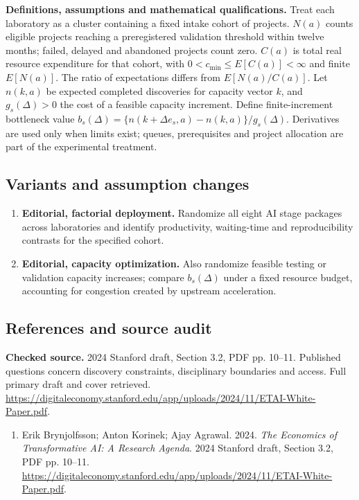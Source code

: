\documentclass[11pt,a4paper]{article}
\begin{document}
\textbf{Definitions, assumptions and mathematical qualifications.} Treat each laboratory as a cluster containing a fixed intake cohort of projects. \(N(a)\) counts eligible projects reaching a preregistered validation threshold within twelve months; failed, delayed and abandoned projects count zero. \(C(a)\) is total real resource expenditure for that cohort, with \(0<c_{\min}\leq E[C(a)]<\infty\) and finite \(E[N(a)]\). The ratio of expectations differs from \(E[N(a)/C(a)]\). Let \(n(k,a)\) be expected completed discoveries for capacity vector \(k\), and \(g_s(\Delta)>0\) the cost of a feasible capacity increment. Define finite-increment bottleneck value \(b_s(\Delta)=\{n(k+\Delta e_s,a)-n(k,a)\}/g_s(\Delta)\). Derivatives are used only when limits exist; queues, prerequisites and project allocation are part of the experimental treatment.
\subsection*{Variants and assumption changes}
\begin{enumerate}
\item \textbf{Editorial, factorial deployment.} Randomize all eight AI stage packages across laboratories and identify productivity, waiting-time and reproducibility contrasts for the specified cohort.
\item \textbf{Editorial, capacity optimization.} Also randomize feasible testing or validation capacity increases; compare \(b_s(\Delta)\) under a fixed resource budget, accounting for congestion created by upstream acceleration.
\end{enumerate}
\subsection*{References and source audit}
\textbf{Checked source.} 2024 Stanford draft, Section 3.2, PDF pp. 10--11. Published questions concern discovery constraints, disciplinary boundaries and access. Full primary draft and cover retrieved. \url{https://digitaleconomy.stanford.edu/app/uploads/2024/11/ETAI-White-Paper.pdf}.
\begin{enumerate}\raggedright
\item\hypertarget{definitions:source:30007692:1}{} Erik Brynjolfsson; Anton Korinek; Ajay Agrawal. 2024. \emph{The Economics of Transformative AI: A Research Agenda}. 2024 Stanford draft, Section 3.2, PDF pp. 10--11.
\url{https://digitaleconomy.stanford.edu/app/uploads/2024/11/ETAI-White-Paper.pdf}.
\end{enumerate}
\end{document}
